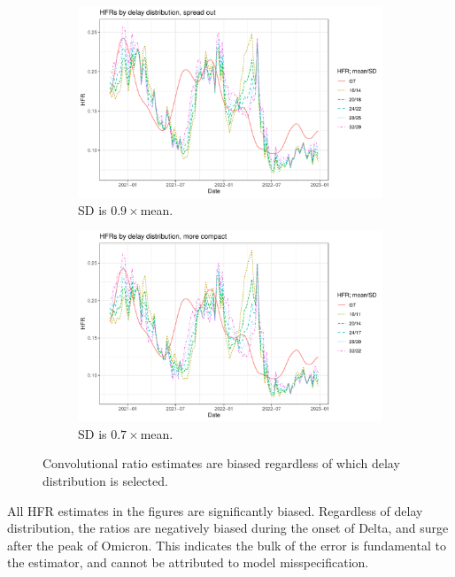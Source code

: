 \documentclass{article}
\begin{document}
\begin{figure}
     \centering
     \begin{subfigure}[b]{0.45\linewidth}
         \centering
         \includegraphics[width=\linewidth]{Figs/Real/hfrs_by_delay1.pdf}
         \caption{SD is $0.9\times$mean.}
         \label{fig:delay1}
     \end{subfigure}
     \hfill
     \begin{subfigure}[b]{0.45\linewidth}
         \centering
         \includegraphics[width=\linewidth]{Figs/Real/hfrs_by_delay2.pdf}
         \caption{SD is $0.7\times$mean.}
         \label{fig:delay2}
     \end{subfigure}
        \caption{Convolutional ratio estimates are biased regardless of which delay distribution is selected.}
        \label{fig:delays}
\end{figure}
All HFR estimates in the figures are significantly biased. Regardless of delay distribution, the ratios are negatively biased during the onset of Delta, and surge after the peak of Omicron. This indicates the bulk of the error is fundamental to the estimator, and cannot be attributed to model misspecification. 
\end{document}
